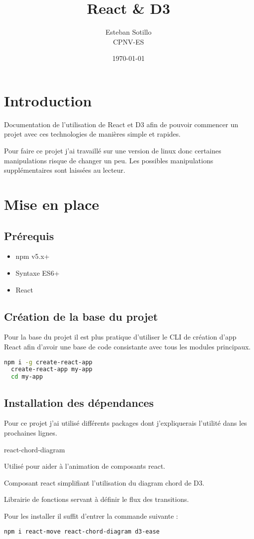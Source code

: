\documentclass[a4paper, french, 12pt]{extarticle}
\title{React \& D3}
\author{Esteban Sotillo\\{\small CPNV-ES}}
\date{{\small \today}}
\begin{document}
\maketitle
\section{Introduction}
Documentation de l'utilisation de React et D3 afin de pouvoir commencer un projet avec ces technologies de manières simple et rapides.

Pour faire ce projet j'ai travaillé sur une version de linux donc certaines manipulations risque de changer un peu. Les possibles manipulations supplémentaires sont laissées au lecteur.

\section{Mise en place}
\subsection{Prérequis}
\begin{itemize}
  \item npm v5.x+
  \item Syntaxe ES6+
  \item React
\end{itemize}

\subsection{Création de la base du projet}
Pour la base du projet il est plus pratique d'utiliser le CLI de création d'app React afin d'avoir une base de code consistante avec tous les modules principaux.
\begin{lstlisting}[language=bash]
  npm i -g create-react-app
  create-react-app my-app
  cd my-app
\end{lstlisting}

\subsection{Installation des dépendances}
Pour ce projet j'ai utilisé différents packages dont j'expliquerais l'utilité dans les prochaines lignes.

\begin{labeling}{react-chord-diagram}
  \item [react-move] Utilisé pour aider à l'animation de composants react.
  \item [react-chord-diagram] Composant react simplifiant l'utilisation du diagram chord de D3.
  \item [d3-ease] Librairie de fonctions servant à définir le flux des transitions.
\end{labeling}
Pour les installer il suffit d'entrer la commande suivante : 
\begin{lstlisting}[language=bash]
  npm i react-move react-chord-diagram d3-ease
\end{lstlisting}
\end{document}
